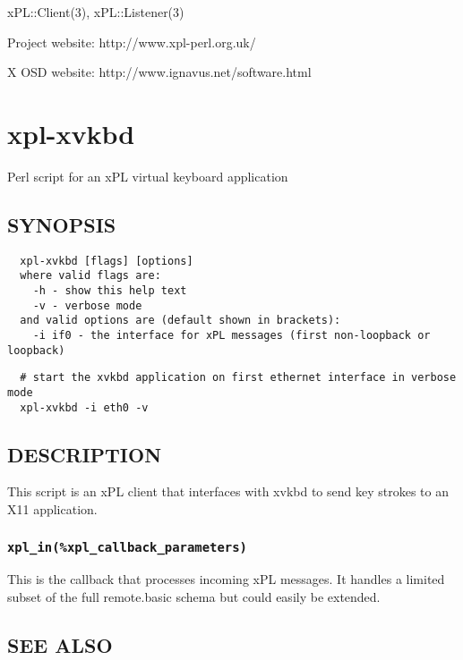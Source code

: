 xPL::Client(3), xPL::Listener(3)



Project website: http://www.xpl-perl.org.uk/



X OSD website: http://www.ignavus.net/software.html

\section{xpl-xvkbd\label{xpl-xvkbd}}


Perl script for an xPL virtual keyboard application

\subsection*{SYNOPSIS\label{xpl-xvkbd_SYNOPSIS}}
\begin{verbatim}
  xpl-xvkbd [flags] [options]
  where valid flags are:
    -h - show this help text
    -v - verbose mode
  and valid options are (default shown in brackets):
    -i if0 - the interface for xPL messages (first non-loopback or loopback)
\end{verbatim}
\begin{verbatim}
  # start the xvkbd application on first ethernet interface in verbose mode
  xpl-xvkbd -i eth0 -v
\end{verbatim}
\subsection*{DESCRIPTION\label{xpl-xvkbd_DESCRIPTION}}


This script is an xPL client that interfaces with xvkbd to send key strokes
to an X11 application.

\subsubsection*{\texttt{xpl\_in(\%xpl\_callback\_parameters)}\label{xpl-xvkbd_xpl_in_xpl_callback_parameters_}}


This is the callback that processes incoming xPL messages.  It handles
a limited subset of the full remote.basic schema but could easily be
extended.

\subsection*{SEE ALSO\label{xpl-xvkbd_SEE_ALSO}}


